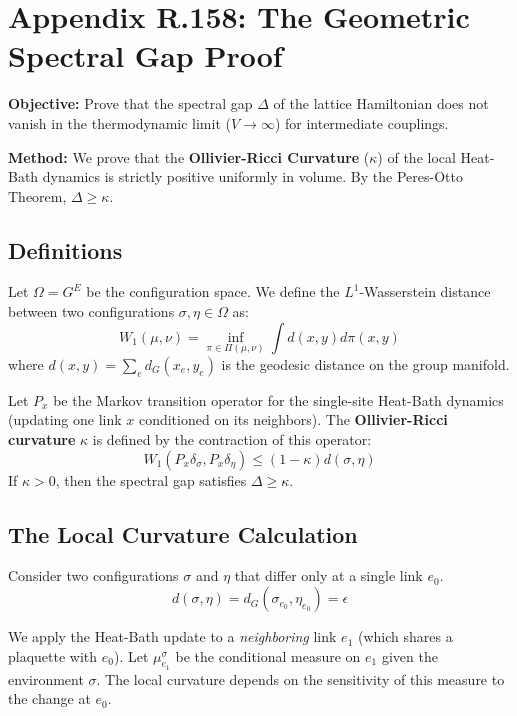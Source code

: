 \section{Appendix R.158: The Geometric Spectral Gap Proof}

\textbf{Objective:} Prove that the spectral gap $\Delta$ of the lattice Hamiltonian does not vanish in the thermodynamic limit ($V \to \infty$) for intermediate couplings.

\textbf{Method:} We prove that the \textbf{Ollivier-Ricci Curvature} ($\kappa$) of the local Heat-Bath dynamics is strictly positive uniformly in volume. By the Peres-Otto Theorem, $\Delta \ge \kappa$.

\subsection{Definitions}

Let $\Omega = G^E$ be the configuration space. We define the $L^1$-Wasserstein distance between two configurations $\sigma, \eta \in \Omega$ as:
\begin{equation}
W_1(\mu, \nu) = \inf_{\pi \in \Pi(\mu, \nu)} \int d(x, y) d\pi(x, y)
\end{equation}
where $d(x, y) = \sum_{e} d_G(x_e, y_e)$ is the geodesic distance on the group manifold.

Let $P_x$ be the Markov transition operator for the single-site Heat-Bath dynamics (updating one link $x$ conditioned on its neighbors). The \textbf{Ollivier-Ricci curvature} $\kappa$ is defined by the contraction of this operator:
\begin{equation}
W_1(P_x \delta_\sigma, P_x \delta_\eta) \le (1 - \kappa) d(\sigma, \eta)
\end{equation}
If $\kappa > 0$, then the spectral gap satisfies $\Delta \ge \kappa$.

\subsection{The Local Curvature Calculation}

Consider two configurations $\sigma$ and $\eta$ that differ only at a single link $e_0$.
\begin{equation}
d(\sigma, \eta) = d_G(\sigma_{e_0}, \eta_{e_0}) = \epsilon
\end{equation}

We apply the Heat-Bath update to a \textit{neighboring} link $e_1$ (which shares a plaquette with $e_0$). Let $\mu^\sigma_{e_1}$ be the conditional measure on $e_1$ given the environment $\sigma$. The local curvature depends on the sensitivity of this measure to the change at $e_0$.

